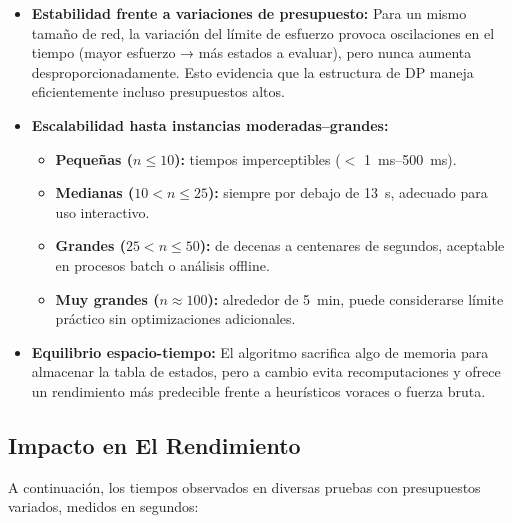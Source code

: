 \documentclass[11pt,letter]{article}
\begin{document}
\begin{itemize}
\begin{itemize}
    \item \textbf{Estabilidad frente a variaciones de presupuesto:}
    Para un mismo tamaño de red, la variación del límite de esfuerzo provoca oscilaciones en el tiempo (mayor esfuerzo → más estados a evaluar), pero nunca aumenta desproporcionadamente. Esto evidencia que la estructura de DP maneja eficientemente incluso presupuestos altos.

    \item \textbf{Escalabilidad hasta instancias moderadas–grandes:}

        \begin{itemize}

          \item \textbf{Pequeñas ($n \leq 10$):}
          tiempos imperceptibles ($<$ 1~ms–500~ms).

          \item \textbf{Medianas ($10 < n \leq 25$):}
          siempre por debajo de 13~s, adecuado para uso interactivo.

          \item \textbf{Grandes ($25 < n \leq 50$):}
          de decenas a centenares de segundos, aceptable en procesos batch o análisis offline.

          \item \textbf{Muy grandes ($n \approx 100$):}
          alrededor de 5~min, puede considerarse límite práctico sin optimizaciones adicionales.

        \end{itemize}


    \item \textbf{Equilibrio espacio-tiempo:}
    El algoritmo sacrifica algo de memoria para almacenar la tabla de estados, pero a cambio evita recomputaciones y ofrece un rendimiento más predecible frente a heurísticos voraces o fuerza bruta.

    \end{itemize}

    \subsection{Impacto en El Rendimiento}
    A continuación, los tiempos observados en diversas pruebas con presupuestos variados, medidos en segundos:


\end{itemize}
\end{document}
